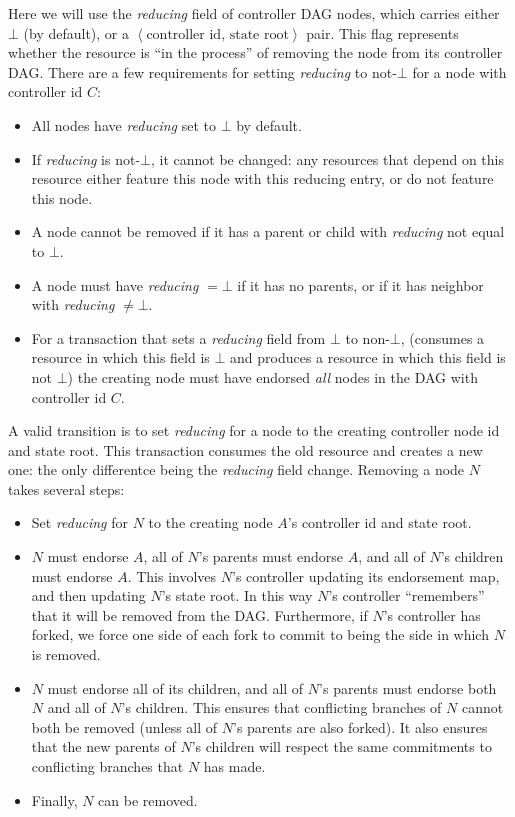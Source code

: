 \documentclass[a4paper,USenglish,cleveref, autoref, thm-restate, anonymous]{lipics-v2021}
\newcommand{\an}[1]{{\left\langle{{#1}}\right\rangle}}
\begin{document}
Here we will use the \textit{reducing} field of controller DAG nodes, which carries either $\bot$ (by default), or a $\an{\textrm{controller id, state root}}$ pair.
This flag represents whether the resource is ``in the process'' of removing the node from its controller DAG.
There are a few requirements for setting \textit{reducing} to not-$\bot$ for a node with controller id $C$:
\begin{itemize}
\item All nodes have \textit{reducing} set to $\bot$ by default. 
\item If \textit{reducing} is not-$\bot$, it cannot be changed: any resources that depend on this resource either feature this node with this reducing entry, or do not feature this node.
\item A node cannot be removed if it has a parent or child with \textit{reducing} not equal to $\bot$. 
\item A node must have \textit{reducing}  $=\bot$ if it has no parents, or if it has neighbor with \textit{reducing} $\ne\bot$. 
\item For a transaction that sets a \textit{reducing} field from $\bot$ to non-$\bot$, (consumes a resource in which this field is $\bot$ and produces a resource in which this field is not $\bot$) the creating node must have endorsed \textit{all} nodes in the DAG with controller id $C$.
\end{itemize}


A valid transition is to set \textit{reducing} for a node to the creating controller node id and state root. 
This transaction consumes the old resource and creates a new one: the only differentce being the \emph{reducing} field change.
Removing a node $N$ takes several steps:
\begin{itemize}
    \item Set \textit{reducing} for $N$ to the creating node $A$'s  controller id and state root.
    \item $N$ must endorse $A$, all of $N$'s parents must endorse $A$, and all of $N$'s children must endorse $A$.
          This involves $N$'s controller updating its endorsement map, and then updating $N$'s state root.
          In this way $N$'s controller ``remembers'' that it will be removed from the DAG.
          Furthermore, if $N$'s controller has forked, we force one side of each fork to commit to being the side in which $N$ is removed.
    \item $N$ must endorse all of its children, and all of $N$'s parents must endorse both $N$ and all of $N$'s children.
          This ensures that conflicting branches of $N$ cannot both be removed (unless all of $N$'s parents are also forked).
          It also ensures that the new parents of $N$'s children will respect the same commitments to conflicting branches that $N$ has made. 
    \item Finally, $N$ can be removed.
\end{itemize}
\end{document}
